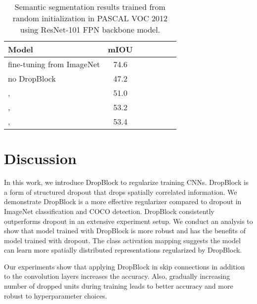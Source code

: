\documentclass{article}
\begin{document}
\begin{table}[h!]
\setlength{\tabcolsep}{8pt}
\begin{center}
\small
\begin{tabular}{l|cccccc}
\hline
  \footnotesize Model  & \footnotesize mIOU \\
\hline \hline
\footnotesize fine-tuning from ImageNet & 74.6  \\
\hline
\footnotesize no DropBlock               & 47.2\\
\footnotesize ,   & 51.0 \\
\footnotesize ,   & 53.2 \\
\footnotesize ,   & 53.4 \\
\hline
\end{tabular}
\end{center}
\caption{Semantic segmentation results trained from random initialization in PASCAL VOC 2012 using ResNet-101 FPN backbone model.}
\label{table:retinanetseg}
\end{table}

\section{Discussion}
In this work, we introduce DropBlock to regularize training CNNs. DropBlock is a form of structured dropout that drops spatially correlated information. We demonstrate DropBlock is a more effective regularizer compared to dropout in ImageNet classification and COCO detection. DropBlock consistently outperforms dropout in an extensive experiment setup. We conduct an analysis to show that model trained with DropBlock is more robust and has the benefits of model trained with dropout. The class activation mapping suggests the model can learn more spatially distributed representations regularized by DropBlock.

Our experiments show that applying DropBlock in skip connections in addition to the convolution layers increases the accuracy. Also, gradually increasing number of dropped units during training leads to better accuracy and more robust to hyperparameter choices.


\small


\end{document}
